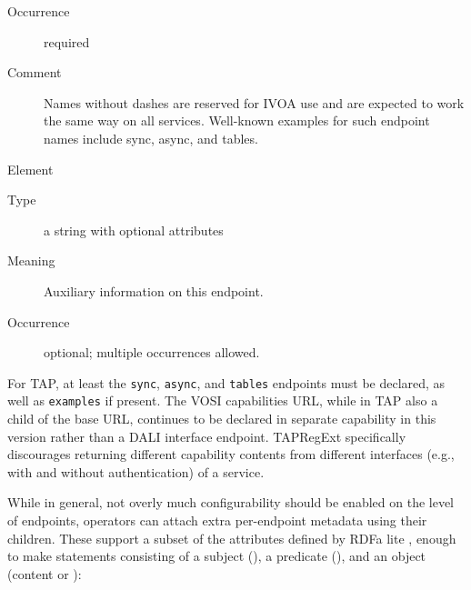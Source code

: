 \documentclass{ivoa}
\begin{document}
\begin{generated}
\begin{bigdescription}
\begin{description}
\item[Occurrence] required
\item[Comment] 
            Names without dashes are reserved for IVOA use and are expected to
            work the same way on all services.  Well-known examples for
            such endpoint names include sync, async, and tables.
          

\end{description}
\item[Element \xmlel{meta}]
\begin{description}
\item[Type] a string with optional attributes
\item[Meaning] 
            Auxiliary information on this endpoint.
          
\item[Occurrence] optional; multiple occurrences allowed.

\end{description}


\end{bigdescription}\endgroup

\endgroup
\end{generated}


For TAP, at least the \verb|sync|, \verb|async|, and \verb|tables|
endpoints must be declared, as well as \verb|examples| if present.  The VOSI
capabilities URL, while in TAP also a child of the base URL,
continues to be declared in separate capability in this version rather
than a DALI interface endpoint.  TAPRegExt specifically discourages
returning different capability contents from different interfaces (e.g.,
with and without authentication) of a service.

While in general, not overly much configurability should be enabled on
the level of endpoints, operators can attach extra per-endpoint metadata
using their  children.  These support a subset of
the attributes defined by RDFa lite \citep{std:RDFaLite11}, enough to
make statements consisting of a subject (), a predicate
(), and an object (content or ):
\end{document}
